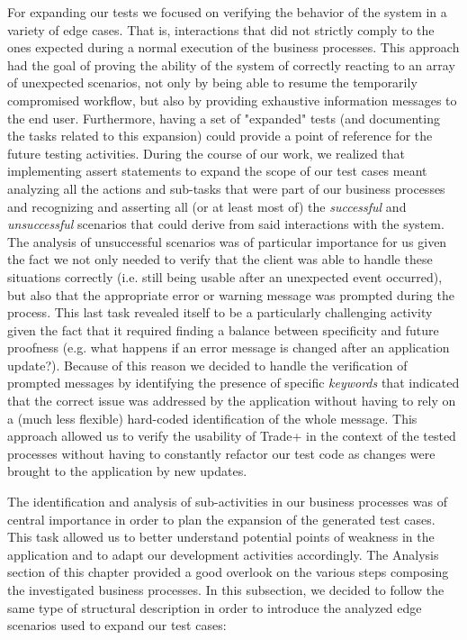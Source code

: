 For expanding our tests we focused on verifying the behavior of the system in a variety of edge cases. That is, interactions that did not strictly comply to the ones expected during a normal execution of the business processes. This approach had the goal of proving the ability of the system of correctly reacting to an array of unexpected scenarios, not only by being able to resume the temporarily compromised workflow, but also by providing exhaustive information messages to the end user. Furthermore, having a set of "expanded" tests (and documenting the tasks related to this expansion) could provide a point of reference for the future testing activities. 
During the course of our work, we realized that implementing assert statements to expand the scope of our test cases meant analyzing all the actions and sub-tasks that were part of our business processes and recognizing and asserting all (or at least most of) the \textit{successful} and \textit{unsuccessful} scenarios that could derive from said interactions with the system.
The analysis of unsuccessful scenarios was of particular importance for us given the fact we not only needed to verify that the client was able to handle these situations correctly (i.e. still being usable after an unexpected event occurred), but also that the appropriate error or warning message was prompted during the process. 
This last task revealed itself to be a particularly challenging activity given the fact that it required finding a balance between specificity and future proofness (e.g. what happens if an error message is changed after an application update?). Because of this reason we decided to handle the verification of prompted messages by identifying the presence of specific \textit{keywords} that indicated that the correct issue was addressed by the application without having to rely on a (much less flexible) hard-coded identification of the whole message. This approach allowed us to verify the usability of Trade+ in the context of the tested processes without having to constantly refactor our test code as changes were brought to the application by new updates.

The identification and analysis of sub-activities in our business processes was of central importance in order to plan the expansion of the generated test cases. This task allowed us to better understand potential points of weakness in the application and to adapt our development activities accordingly. The Analysis section of this chapter provided a good overlook on the various steps composing the investigated business processes. In this subsection, we decided to follow the same type of structural description in order to introduce the analyzed edge scenarios used to expand our test cases:

